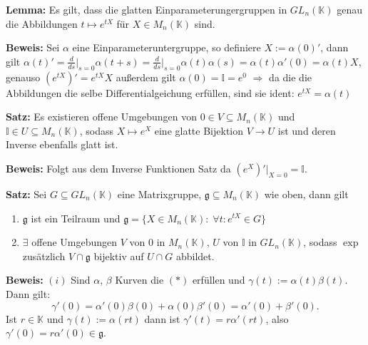 \documentclass[11pt]{beamer}
\begin{document}
\begin{frame}
	\textbf{Lemma:}
	Es gilt, dass die glatten Einparameterungergruppen in $GL_n(\mathbb{K})$ genau die Abbildungen $t\mapsto e^{tX}$ für $X\in M_n(\mathbb{K})$ sind. \\[1em] \pause

	\textbf{Beweis:}
	Sei $\alpha$ eine Einparameteruntergruppe, so definiere $X:=\alpha(0)'$, \pause
	dann gilt $\alpha(t)' = \frac{d}{ds}\Big\vert_{s=0}\alpha(t+s) = \frac{d}{ds}\Big\vert_{s=0} \alpha(t)\alpha(s) = \alpha(t)\alpha'(0) = \alpha(t)X$,\pause
	 genauso $(e^{tX})' = e^{tX}X$ \pause
	außerdem gilt $\alpha(0) = \mathbb{I} = e^0$
	$\Rightarrow$ da die die Abbildungen die selbe Differentialgeichung erfüllen, sind sie ident: $e^{tX} = \alpha(t)$ \\[2em] \pause

	\textbf{Satz:}
	Es existieren offene Umgebungen von $0\in V \subseteq M_n(\mathbb{K})$ und $\mathbb{I}\in U\subseteq M_n(\mathbb{K})$, sodass $X\mapsto e^X$ eine glatte Bijektion $V\to U$ ist und deren Inverse ebenfalls glatt ist.\\[1em] \pause

	\textbf{Beweis:}
	Folgt aus dem Inverse Funktionen Satz da $(e^X)'\big\vert_{X=0} = \mathbb{I}$.
\end{frame}

\begin{frame}
	\textbf{Satz:}
	Sei $G\subseteq GL_n(\mathbb{K})$ eine Matrixgruppe, $\mathfrak{g}\subseteq M_n(\mathbb{K})$ wie oben, dann gilt \pause
	\begin{enumerate}[label = $(\roman*)$]
		\item $\mathfrak{g}$ ist ein Teilraum und $\mathfrak{g} = \{ X\in M_n(\mathbb{K}):\; \forall t:e^{tX}\in G \}$ \pause

		\item $\exists$ offene Umgebungen $V$ von 0 in $M_n(\mathbb{K})$, $U$ von $\mathbb{I}$ in $GL_n(\mathbb{K})$, sodass $\exp$ zusätzlich $V\cap \mathfrak{g}$ bijektiv auf $U\cap G$ abbildet. \pause
	\end{enumerate}

	\textbf{Beweis:} $(i)$ Sind $\alpha$, $\beta$ Kurven die $(*)$ erfüllen und
	$\gamma(t):= \alpha(t)\beta(t)$. Dann gilt: \pause
	\begin{equation*}
	\gamma'(0) = \alpha'(0)\beta(0) + \alpha(0)\beta'(0) = \alpha'(0)+\beta'(0).
	\end{equation*} \pause
	Ist $r\in \mathbb{K}$ und $\gamma(t) := \alpha(rt)$ dann ist
	$\gamma'(t) = r\alpha'(rt)$, also $\gamma'(0) = r\alpha'(0)\in \mathfrak{g}$. \\[0.5em]
\end{frame}
\end{document}
